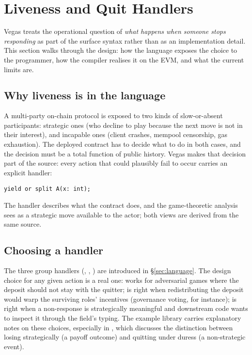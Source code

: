 \section{Liveness and Quit Handlers}
\label{sec:liveness}

Vegas treats the operational question of \emph{what happens when
someone stops responding} as part of the surface syntax rather
than as an implementation detail.  This section walks through the
design: how the language exposes the choice to the programmer,
how the compiler realises it on the EVM, and what the current
limits are.

\subsection{Why liveness is in the language}

A multi-party on-chain protocol is exposed to two kinds of
slow-or-absent participants: strategic ones (who decline to play
because the next move is not in their interest), and incapable
ones (client crashes, mempool censorship, gas exhaustion).  The
deployed contract has to decide what to do in both cases, and the
decision must be a total function of public history.  Vegas
makes that decision part of the source: every action that could
plausibly fail to occur carries an explicit handler:

\begin{lstlisting}[style=vg]
yield or split A(x: int);
\end{lstlisting}

The handler describes what the contract does, and the
game-theoretic analysis sees  as a strategic move
available to the actor; both views are derived from the same
source.

\subsection{Choosing a handler}

The three group handlers (, , ) are
introduced in \S\ref{sec:language}.  The design choice for any
given action is a real one:  works for adversarial
games where the deposit should not stay with the quitter;
 is right when redistributing the deposit would warp the
surviving roles' incentives (governance voting, for instance);
 is right when a non-response is strategically
meaningful and downstream code wants to inspect it through the
field's  typing.  The example library carries
explanatory notes on these choices, especially in
, which discusses the distinction between
losing strategically (a payoff outcome) and quitting under
duress (a non-strategic event).

